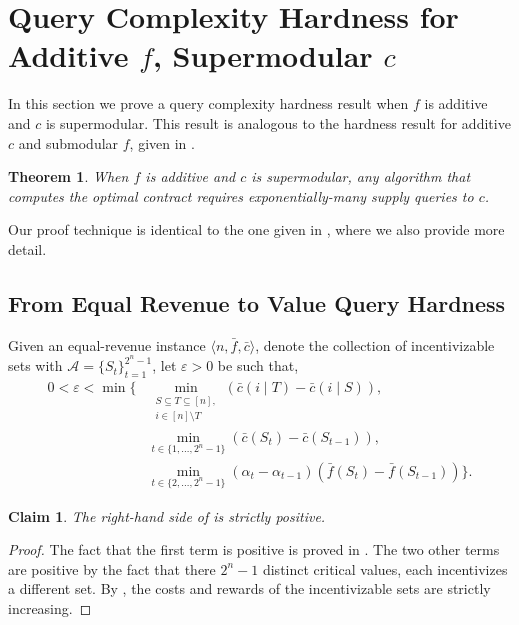\documentclass[11pt]{article}
\newtheorem{theorem}{Theorem}
\newtheorem{claim}{Claim}
\newcommand{\eps}{\varepsilon}
\newcommand{\I}{\mathcal{I}}
\newcommand{\IS}{\mathcal{A}}
\newcommand{\feq}{\bar{f}}
\newcommand{\ceq}{\bar{c}}
\newcommand{\eqRevInst}{\langle n,\feq,\ceq \rangle}
\begin{document}
\section{Query Complexity Hardness for Additive $f$, Supermodular $c$}\label{sec:demandHardness_SupMod_c}

In this section we prove a query complexity hardness result when $f$ is additive and $c$ is supermodular.
This result is analogous to the hardness result for additive $c$ and submodular $f$, given in .

\begin{theorem}\label{thm:expDemandQueries_SupMod_c}
    When $f$ is additive and $c$ is supermodular, any algorithm that computes the optimal contract requires exponentially-many supply queries to $c$.
\end{theorem}
Our proof technique is identical to the one given in , where we also provide more detail.


\subsection{From Equal Revenue to Value Query Hardness}\label{sec:eqToVal_SupMod_c}
\newcommand{\perturbedInstSupModC}{\langle n,\feq,\ceq_k \rangle}
\newcommand{\familyISupModC}{\I = \{ \perturbedInstSupModC \}_{k=1}^{2^n}}

Given an equal-revenue instance $\eqRevInst$, denote the collection of incentivizable sets with $\IS = \{S_t\}_{t=1}^{2^n-1}$, let $\eps>0$ be such that,
\begin{align}\label{eq:eps_0_SupMod_c}
0 < 
\eps < \min \Bigg\{ 
& \min_{\substack{S \subseteq T \subseteq [n], \\ i \in [n]\setminus T}} (\ceq(i \mid T) - \ceq(i \mid S)), \nonumber \\
& \min_{t \in \{1,\dots,2^n-1\}} \left(\ceq(S_{t})-\ceq(S_{t-1})\right),  \\
& \min_{t \in \{2,\dots,2^n-1\}} (\alpha_t-\alpha_{t-1})(\feq(S_t) - \feq(S_{t-1})) \nonumber
\Bigg\}.
\nonumber
\end{align}

\begin{claim}
    The right-hand side of  is strictly positive.
\end{claim}
\begin{proof}
    The fact that the first term is positive is proved in . 
    The two other terms are positive by the fact that there $2^n-1$ distinct critical values, each incentivizes a different set.
    By , the costs and rewards of the incentivizable sets are strictly increasing.
\end{proof}
\end{document}
